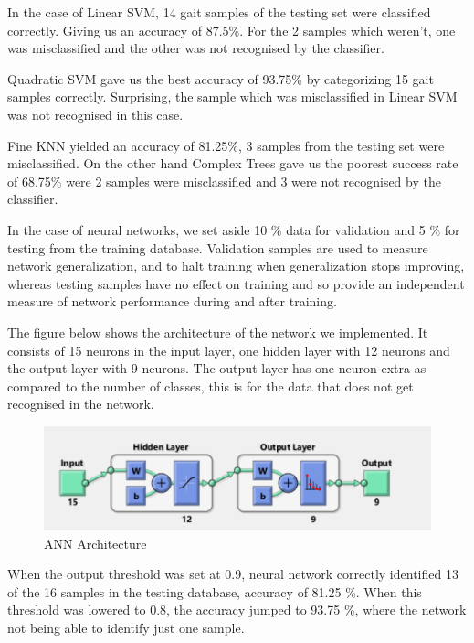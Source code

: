 \noindent In the case of Linear SVM, 14 gait samples of the testing set were classified correctly. Giving us an accuracy of 87.5\%. For the 2 samples which weren’t, one was misclassified and the other was not recognised by the classifier.

\noindent Quadratic SVM gave us the best accuracy of 93.75\% by categorizing 15 gait samples correctly. Surprising, the sample which was misclassified in Linear SVM was not recognised in this case.

\noindent Fine KNN yielded an accuracy of 81.25\%, 3 samples from the testing set were misclassified. On the other hand Complex Trees gave us the poorest success rate of 68.75\% were 2 samples were misclassified and 3 were not recognised by the classifier. 

\noindent In the case of neural networks, we set aside 10 \% data for validation and 5 \% for testing from the training database. Validation samples are used to measure network generalization, and to halt training when generalization stops improving, whereas testing samples have no effect on training and so provide an independent measure of network performance during and after training.\\



\newpage

\noindent The figure below shows the architecture of the network we implemented. It consists of 15 neurons in the input layer, one hidden layer with 12 neurons and the output layer with 9 neurons. The output layer has one neuron extra as compared to the number of classes, this is for the data that does not get recognised in the network.

\begin{figure}[h]
\centering
\includegraphics[scale=0.9]{anna.png}
\caption{ANN Architecture}
\end{figure}


\noindent When the output threshold was set at 0.9, neural network correctly identified 13 of the 16 samples in the testing database, accuracy of 81.25 \%. When this threshold was lowered to 0.8, the accuracy jumped to 93.75 \%, where the network not being able to identify just one sample.